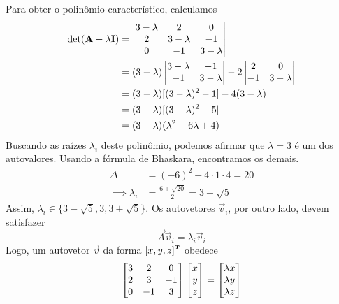 \documentclass{homework}
\begin{document}
		\subsubquest Para obter o polinômio característico, calculamos
			\begin{align*}
				\det (\vec{A} - \lambda \vec{I}) &= \left|\begin{array}{@{}ccc@{}}
				3 - \lambda &  2 &  0 \\
				2 & 3 - \lambda & -1 \\
				0 & -1 & 3 - \lambda
				\end{array}\right|\\
				&= (3 - \lambda) \left|\begin{array}{@{}cc@{}}
				3 - \lambda & -1 \\
				-1 & 3 - \lambda
				\end{array}\right| - 2 \left|\begin{array}{@{}cc@{}}
				 2 &  0 \\
				-1 & 3 - \lambda
				\end{array}\right|\\
				&= (3 - \lambda) [(3 - \lambda)^2 - 1] - 4 (3 - \lambda)\\
				&= (3 - \lambda) [(3 - \lambda)^2 - 5]\\
				&= (3 - \lambda) (\lambda^2 - 6\lambda + 4)\\
			\end{align*}
		Buscando as raízes $\lambda_i$ deste polinômio, podemos afirmar que $\lambda = 3$ é um dos autovalores. Usando a fórmula de Bhaskara, encontramos os demais.
			\begin{align*}
				\Delta &= (-6)^2 - 4 \cdot 1 \cdot 4 = 20\\
				\implies \lambda_i &= \frac{6 \pm \sqrt{20}}{2} = 3 \pm \sqrt{5}
			\end{align*}
		Assim, $\lambda_i \in \{3 - \sqrt{5}, 3, 3 + \sqrt{5}\}$. Os autovetores $\vec{v}_i$, por outro lado, devem satisfazer
			$$ \vec{A} \vec{v}_i = \lambda_i \vec{v}_i $$
		Logo, um autovetor $\vec{v}$ da forma $\left[x, y, z\right]^{\text{\bfseries\tiny T}}$ obedece
			\begin{align*}
				\left[\begin{array}{@{}ccc@{}}
				3 &  2 &  0 \\
				2 &  3 & -1 \\
				0 & -1 &  3
				\end{array}\right] \left[\begin{array}{@{}c@{}}
				x \\
				y \\
				z 
				\end{array}\right] = \left[\begin{array}{@{}c@{}}
				\lambda x \\
				\lambda y \\
				\lambda z 
				\end{array}\right]
			\end{align*}
\end{document}
